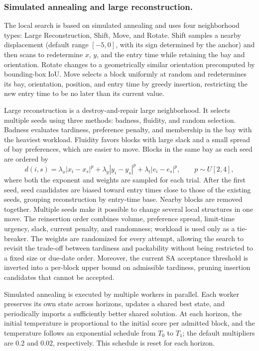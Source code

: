 \documentclass[runningheads]{llncs}
\begin{document}
\subsubsection{Simulated annealing and large reconstruction.}
The local search is based on simulated annealing\cite{kirkpatrick1983} and uses four neighborhood types: Large Reconstruction, Shift, Move, and Rotate. Shift samples a nearby displacement (default range $[-5,0]$, with its sign determined by the anchor) and then scans to redetermine $x$, $y$, and the entry time while retaining the bay and orientation. Rotate changes to a geometrically similar orientation precomputed by bounding-box IoU. Move selects a block uniformly at random and redetermines its bay, orientation, position, and entry time by greedy insertion, restricting the new entry time to be no later than its current value.

Large reconstruction is a destroy-and-repair large neighborhood.
It selects multiple seeds using three methods: badness, fluidity, and random
selection. Badness evaluates tardiness, preference penalty, and membership in
the bay with the heaviest workload. Fluidity favors blocks with large slack
and a small spread of bay preferences, which are easier to move. Blocks in the
same bay as each seed are ordered by
\begin{equation}
d(i,s)=\lambda_x|x_i-x_s|^p+\lambda_y|y_i-y_s|^p
+\lambda_t|e_i-e_s|^p,\qquad p\sim U[2,4],
\end{equation}
where both the exponent and weights are sampled for each trial. After the first seed, seed candidates are biased toward entry times close to those of the existing seeds, grouping reconstruction by entry-time base. Nearby blocks are removed together. Multiple seeds make it possible to change several local structures in one move. The reinsertion order combines volume, preference spread, limit-time urgency, slack, current penalty, and randomness; workload is used only as a tie-breaker. The weights are randomized for every attempt, allowing the search to revisit the trade-off between tardiness and packability without being restricted to a fixed size or due-date order. Moreover, the current SA acceptance threshold is inverted into a per-block upper bound on admissible tardiness, pruning insertion candidates that cannot be accepted.

Simulated annealing is executed by multiple workers in parallel. Each worker preserves its own state across horizons, updates a shared best state, and periodically imports a sufficiently better shared solution. At each horizon, the initial temperature is proportional to the initial score per admitted block, and the temperature follows an exponential schedule from $T_0$ to $T_1$; the default multipliers are 0.2 and 0.02, respectively. This schedule is reset for each horizon.
\end{document}
